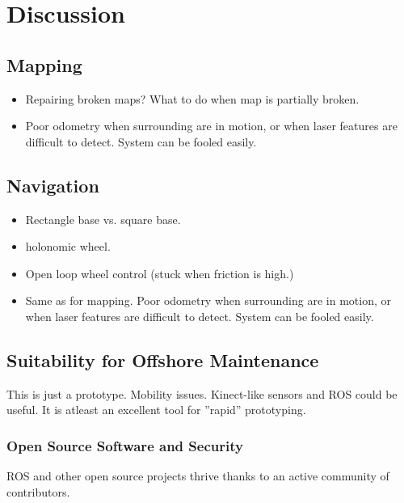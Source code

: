 \chapter{Discussion}
\label{chp:discussion} 

\section{Mapping}

\begin{itemize}
\item Repairing broken maps? What to do when map is partially broken.
\item Poor odometry when surrounding are in motion, or when laser features are difficult to detect. System can be fooled easily. 
\end{itemize}

\section{Navigation}
\begin{itemize}
\item Rectangle base vs. square base.
\item holonomic wheel.
\item Open loop wheel control (stuck when friction is high.)
\item Same as for mapping. Poor odometry when surrounding are in motion, or when laser features are difficult to detect. System can be fooled easily. 
\end{itemize}


\section{Suitability for Offshore Maintenance}

This is just a prototype. Mobility issues.
Kinect-like sensors and ROS could be useful. It is atleast an excellent tool for ''rapid'' prototyping.

\subsection{Open Source Software and Security}

\ac{ROS} and other open source projects thrive thanks to an active community of contributors.